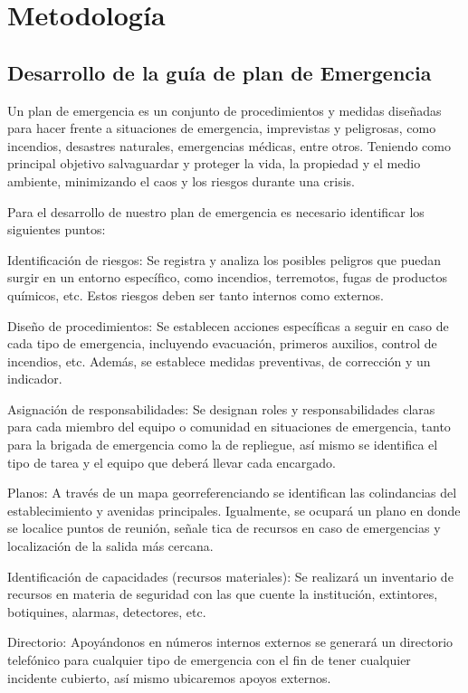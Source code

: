     
    
    \section{Metodología}
    \subsection{Desarrollo de la guía de plan de Emergencia}
    
    Un plan de emergencia es un conjunto de procedimientos y medidas diseñadas para hacer frente a situaciones  de emergencia, imprevistas y peligrosas, como incendios, desastres naturales, emergencias médicas, entre otros. Teniendo como principal objetivo salvaguardar y proteger la vida, la propiedad y el medio ambiente, minimizando el caos y los riesgos durante una crisis.
    
    Para el desarrollo de nuestro plan de emergencia es necesario identificar los siguientes puntos:
    
    Identificación de riesgos: Se registra y analiza los posibles peligros que puedan surgir en un entorno específico, como incendios, terremotos, fugas de productos químicos, etc. Estos riesgos deben ser tanto internos como externos.
    
    
    Diseño de procedimientos: Se establecen acciones específicas a seguir en caso de cada tipo de emergencia, incluyendo evacuación, primeros auxilios, control de incendios, etc. Además, se establece medidas preventivas, de corrección y un indicador.
    
    Asignación de responsabilidades: Se designan roles y responsabilidades claras para cada miembro del equipo o comunidad en situaciones de emergencia, tanto para la brigada de emergencia como la de repliegue, así mismo se identifica el tipo de tarea y el equipo que deberá llevar cada encargado.
    
    
    Planos: A través de un mapa georreferenciando se identifican las colindancias del establecimiento y avenidas principales. Igualmente, se ocupará un plano en donde se localice puntos de reunión, señale tica de recursos en caso de emergencias y localización de la salida más cercana.
    
    Identificación de capacidades (recursos materiales): Se realizará un inventario de recursos en materia de seguridad con las que cuente la institución, extintores, botiquines, alarmas, detectores, etc.
    
    Directorio: Apoyándonos en números internos externos se generará un directorio telefónico para cualquier tipo de emergencia con el fin de tener cualquier incidente cubierto, así mismo ubicaremos apoyos externos.
    
